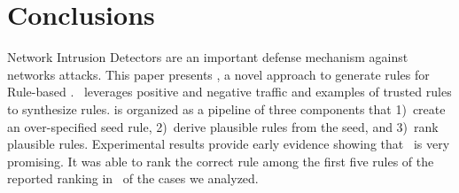 \documentclass[sigconf,review, anonymous]{acmart}
\begin{document}


\section{Conclusions}

Network Intrusion Detectors are an important defense mechanism against
networks attacks. This paper presents \tname{}, a novel approach to
generate rules for Rule-based \nids. \tname\ leverages positive and
negative traffic and examples of trusted rules to synthesize
rules. \tname{} is organized as a pipeline of three components that
1)~create an over-specified seed rule, 2)~derive plausible rules from
the seed, and 3)~rank plausible rules. Experimental results provide
early evidence showing that \tname\ is very promising. It was able to
rank the correct rule among the first five rules of the reported
ranking in \percTopFiveRanking\ of the cases we analyzed.


\balance


\end{document}
